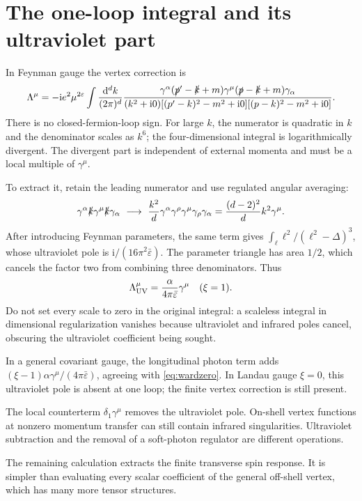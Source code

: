 \documentclass[11pt]{article}
\newcommand{\dd}{\mathrm d}
\newcommand{\ii}{\mathrm i}
\newcommand{\eps}{\varepsilon}
\newcommand{\module}[1]{\clearpage\section{#1}}
\begin{document}
\module{The one-loop integral and its ultraviolet part}
In Feynman gauge the vertex correction is
\begin{equation}
 \Lambda^\mu=-\ii e^2\mu^{2\eps}\int\frac{\dd^dk}{(2\pi)^d}
 \frac{\gamma^\alpha(\slashed p'-\slashed k+m)\gamma^\mu
 (\slashed p-\slashed k+m)\gamma_\alpha}
 {(k^2+\ii0)[(p'-k)^2-m^2+\ii0][(p-k)^2-m^2+\ii0]}.
 \label{eq:vertexloop}
\end{equation}
There is no closed-fermion-loop sign. For large \(k\), the numerator is
quadratic in \(k\) and the denominator scales as \(k^6\); the four-dimensional
integral is logarithmically divergent. The divergent part is independent
of external momenta and must be a local multiple of \(\gamma^\mu\).

To extract it, retain the leading numerator and use regulated angular
averaging:
\begin{equation}
 \gamma^\alpha\slashed k\gamma^\mu\slashed k\gamma_\alpha
 \ \longrightarrow\ 
 \frac{k^2}{d}\gamma^\alpha\gamma^\rho\gamma^\mu\gamma_\rho\gamma_\alpha
 =\frac{(d-2)^2}{d}k^2\gamma^\mu.
\end{equation}
After introducing Feynman parameters, the same term gives
\(\int_\ell\ell^2/(\ell^2-\Delta)^3\), whose ultraviolet pole is
\(\ii/(16\pi^2\bar\eps)\). The parameter triangle has area \(1/2\),
which cancels the factor two from combining three denominators. Thus
\begin{equation}
 \Lambda_{\rm UV}^\mu=\frac{\alpha}{4\pi\bar\eps}\gamma^\mu
 \quad(\xi=1).
\end{equation}
Do not set every scale to zero in the original integral: a scaleless
integral in dimensional regularization vanishes because ultraviolet and
infrared poles cancel, obscuring the ultraviolet coefficient being sought.

In a general covariant gauge, the longitudinal photon term adds
\((\xi-1)\alpha\gamma^\mu/(4\pi\bar\eps)\), agreeing with
\eqref{eq:wardzero}. In Landau gauge \(\xi=0\), this ultraviolet pole is
absent at one loop; the finite vertex correction is still present.

\begin{remarkbox}
The local counterterm \(\delta_1\gamma^\mu\) removes the ultraviolet
pole. On-shell vertex functions at nonzero momentum transfer can still
contain infrared singularities. Ultraviolet subtraction and the removal
of a soft-photon regulator are different operations.
\end{remarkbox}
The remaining calculation extracts the finite transverse spin response.
It is simpler than evaluating every scalar coefficient of the general
off-shell vertex, which has many more tensor structures.
\end{document}
